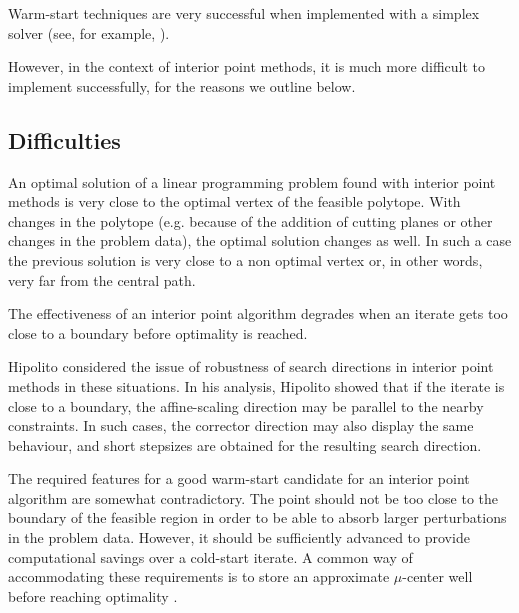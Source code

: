 {Warm-start techniques are very successful 
when implemented with a simplex solver (see, for example, 
\cite{Bixby02}). 


However, in the context of interior point methods, it 
is much more difficult to implement successfully, for the reasons
we outline below.

%
%
\subsection{Difficulties}
\label{sec:WarmStartDifficulties}

An optimal solution of a linear programming problem found with 
interior point methods is very close to the optimal vertex of 
the feasible polytope. With changes in the polytope (e.g. because 
of the addition of cutting planes or other changes in the 
problem data), the optimal solution changes as well.
In such a case the previous solution is very close to a non optimal
vertex or, in other words, very far from the central path. 

The effectiveness of an interior point algorithm degrades when an 
iterate gets too close to a boundary before optimality is reached. 


Hipolito \cite{Hipolito} considered the issue of robustness of 
search directions in interior point methods in these situations.
In his analysis, Hipolito showed that if the iterate is close 
to a boundary, the affine-scaling direction may be parallel to 
the nearby constraints. In such cases, the corrector direction 
may also display the same behaviour, and short stepsizes are 
obtained for the resulting search direction.

The required features for a good warm-start candidate for an
interior point algorithm are somewhat contradictory.
The point should not be too close to the boundary of the feasible 
region in order to be able to absorb larger perturbations in the 
problem data. 
However, it should be sufficiently advanced to provide 
computational savings over a cold-start iterate.
A common way of accommodating these requirements is to store an 
approximate $\mu$-center well before reaching optimality 
\cite{Gondzio98,GondzioGrothey03,GondzioVial,YildirimWright}.

}
